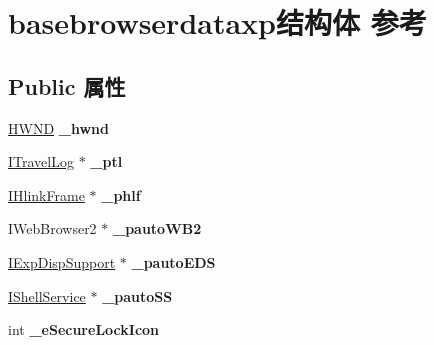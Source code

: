\hypertarget{structbasebrowserdataxp}{}\section{basebrowserdataxp结构体 参考}
\label{structbasebrowserdataxp}
\subsection*{Public 属性}
\begin{DoxyCompactItemize}
\item 
\mbox{\label{structbasebrowserdataxp_aab87a0e69962f0d2ce183ea9bb0eb346}} 
\hyperlink{interfacevoid}{H\+W\+ND} {\bfseries \+\_\+hwnd}
\item 
\mbox{\label{structbasebrowserdataxp_a4828fc5af28eaf94981a183cbdca2381}} 
\hyperlink{interface_i_travel_log}{I\+Travel\+Log} $\ast$ {\bfseries \+\_\+ptl}
\item 
\mbox{\label{structbasebrowserdataxp_afdfa0f9ccf1ef9120c7a0dda080ca904}} 
\hyperlink{interface_i_hlink_frame}{I\+Hlink\+Frame} $\ast$ {\bfseries \+\_\+phlf}
\item 
\mbox{\label{structbasebrowserdataxp_ae7dfe25ef46d38d32da0586c8a2f9f23}} 
I\+Web\+Browser2 $\ast$ {\bfseries \+\_\+pauto\+W\+B2}
\item 
\mbox{\label{structbasebrowserdataxp_ae2df57681aa6df6877921da68d2a19bf}} 
\hyperlink{interface_i_exp_disp_support}{I\+Exp\+Disp\+Support} $\ast$ {\bfseries \+\_\+pauto\+E\+DS}
\item 
\mbox{\label{structbasebrowserdataxp_a36ea5d7ceafb57678d51ce35a0af0e20}} 
\hyperlink{interface_i_shell_service}{I\+Shell\+Service} $\ast$ {\bfseries \+\_\+pauto\+SS}
\item 
\mbox{\label{structbasebrowserdataxp_afc6f325753476ba01aeb390c09ce67e9}} 
int {\bfseries \+\_\+e\+Secure\+Lock\+Icon}
\item 
\mbox{\label{structbasebrowserdataxp_a0b2b114b88fc17ddde46753ffe5b7934}} 

\end{DoxyCompactItemize}
